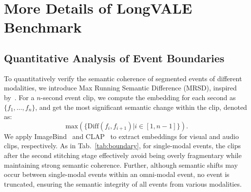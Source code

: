 \clearpage
\maketitlesupplementary

\section{More Details of LongVALE Benchmark}
\subsection{Quantitative Analysis of Event Boundaries}
\label{sec:boundary}
To quantitatively verify the semantic coherence of segmented events of different modalities, we introduce Max Running Semantic Difference (MRSD), inspired by~\cite{chen2024panda}. For a $n$-second event clip, we compute the embedding for each second as $\{f_{1}, \dots, f_{n}\}$, and get the most significant semantic change within the clip, denoted as:   
\begin{equation}
    \mathrm{max}(\{\mathrm{Diff}(f_{i},f_{i+1}) | i \in [1, n-1]\}).
\end{equation}
We apply ImageBind~\cite{girdhar2023imagebind} and CLAP~\cite{wu2023large} to extract embeddings for visual and audio clips, respectively. 
As in Tab.~\ref{tab:boundary}, for single-modal events, the clips after the second stitching stage effectively avoid being overly fragmentary while maintaining strong semantic coherence.
Further, although semantic shifts may occur between single-modal events within an omni-modal event, no event is truncated, ensuring the semantic integrity of all events from various modalities.


\begin{table}[ht]
  \centering
  \caption{Semantic coherence and event length analysis. We randomly sample 1K long videos in our LongVALE. }
  \label{tab:boundary}
\end{table}

